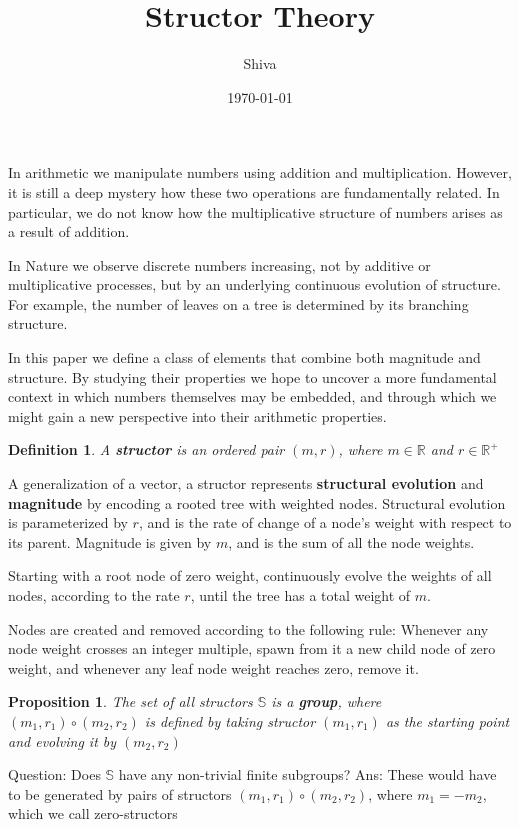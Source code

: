 \documentclass{article}
\title{Structor Theory}
\author{Shiva}
\date{\today}
\newtheorem{definition}{Definition}
\newtheorem{proposition}{Proposition}
\begin{document}
\maketitle

In arithmetic we manipulate numbers using addition and multiplication. However, it is still a deep mystery how these two operations are fundamentally related. In particular, we do not know how the multiplicative structure of numbers arises as a result of addition. 
 
In Nature we observe discrete numbers increasing, not by additive or multiplicative processes, but by an underlying continuous evolution of structure. For example, the number of leaves on a tree is determined by its branching structure. 

In this paper we define a class of elements that combine both magnitude and structure. By studying their properties we hope to uncover a more fundamental context in which numbers themselves may be embedded, and through which we might gain a new perspective into their arithmetic properties. 
 
\begin{definition}
A {\bf structor} is an ordered pair $(m,r)$, where $m \in \mathds{R}$ and $r \in \mathds{R}^{+}$ 
\end{definition}

A generalization of a vector, a structor represents {\bf structural evolution} and {\bf magnitude} by encoding a rooted tree with weighted nodes. Structural evolution is parameterized by $r$, and is the rate of change of a node's weight with respect to its parent. Magnitude is given by $m$, and is the sum of all the node weights. 

Starting with a root node of zero weight, continuously evolve the weights of all nodes, according to the rate $r$, until the tree has a total weight of $m$.

Nodes are created and removed according to the following rule: Whenever any node weight crosses an integer multiple, spawn from it a new child node of zero weight, and whenever any leaf node weight reaches zero, remove it.

\begin{proposition}
The set of all structors $\mathds{S}$ is a {\bf group}, where $(m_{1}, r_{1}) \circ (m_{2}, r_{2})$ is defined by taking structor $(m_{1}, r_{1})$ as the starting point and evolving it by $(m_{2}, r_{2})$ 
\end{proposition}

Question: Does  $\mathds{S}$ have any non-trivial finite subgroups?
Ans: These would have to be generated by pairs of structors $(m_{1}, r_{1}) \circ (m_{2}, r_{2})$, where $m_{1} = -m_{2}$, which we call zero-structors
\end{document}
